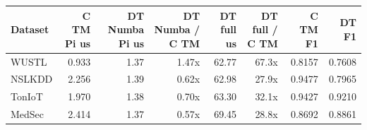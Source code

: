 \begin{tabular}{lrrrrrrr}
\toprule
Dataset & C TM Pi us & DT Numba Pi us & DT Numba / C TM & DT full us & DT full / C TM & C TM F1 & DT F1 \\
\midrule
WUSTL & 0.933 & 1.37 & 1.47x & 62.77 & 67.3x & 0.8157 & 0.7608 \\
NSLKDD & 2.256 & 1.39 & 0.62x & 62.98 & 27.9x & 0.9477 & 0.7965 \\
TonIoT & 1.970 & 1.38 & 0.70x & 63.30 & 32.1x & 0.9427 & 0.9210 \\
MedSec & 2.414 & 1.37 & 0.57x & 69.45 & 28.8x & 0.8692 & 0.8861 \\
\bottomrule
\end{tabular}
